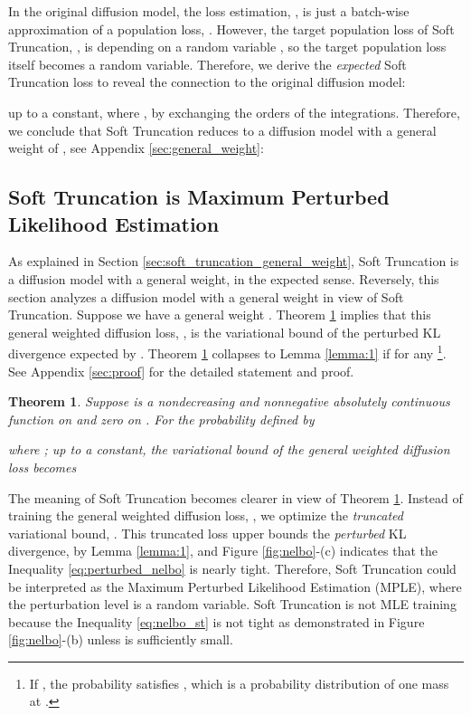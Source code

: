 \documentclass[nohyperref]{article}
\theoremstyle{plain}
\newtheorem{theorem}{Theorem}\newtheorem{proposition}{Proposition}
\theoremstyle{definition}
\theoremstyle{remark}
\begin{document}
In the original diffusion model, the loss estimation, , is just a batch-wise approximation of a population loss, . However, the target population loss of Soft Truncation, , is depending on a random variable , so the target population loss itself becomes a random variable. Therefore, we derive the \textit{expected} Soft Truncation loss to reveal the connection to the original diffusion model:

up to a constant, where , by exchanging the orders of the integrations. Therefore, we conclude that Soft Truncation reduces to a diffusion model with a general weight of , see Appendix \ref{sec:general_weight}:


\subsection{Soft Truncation is Maximum Perturbed Likelihood Estimation}\label{sec:MPLE}

As explained in Section \ref{sec:soft_truncation_general_weight}, Soft Truncation is a diffusion model with a general weight, in the expected sense. Reversely, this section analyzes a diffusion model with a general weight in view of Soft Truncation. Suppose we have a general weight . Theorem \ref{thm:1} implies that this general weighted diffusion loss, , is the variational bound of the perturbed KL divergence expected by . Theorem \ref{thm:1} collapses to Lemma \ref{lemma:1} if  for any \footnote{If , the probability satisfies , which is a probability distribution of one mass at .}. See Appendix \ref{sec:proof} for the detailed statement and proof.
\begin{theorem}\label{thm:1}
Suppose  is a nondecreasing and nonnegative absolutely continuous function on  and zero on . For the probability defined by

where ; up to a constant, the variational bound of the general weighted diffusion loss becomes

\end{theorem}
The meaning of Soft Truncation becomes clearer in view of Theorem \ref{thm:1}. Instead of training the general weighted diffusion loss, , we optimize the \textit{truncated} variational bound, . This truncated loss upper bounds the \textit{perturbed} KL divergence,  by Lemma \ref{lemma:1}, and Figure \ref{fig:nelbo}-(c) indicates that the Inequality \eqref{eq:perturbed_nelbo} is nearly tight. Therefore, Soft Truncation could be interpreted as the Maximum Perturbed Likelihood Estimation (MPLE), where the perturbation level is a random variable. Soft Truncation is not MLE training because the Inequality \ref{eq:nelbo_st} is not tight as demonstrated in Figure \ref{fig:nelbo}-(b) unless  is sufficiently small. 
\end{document}

